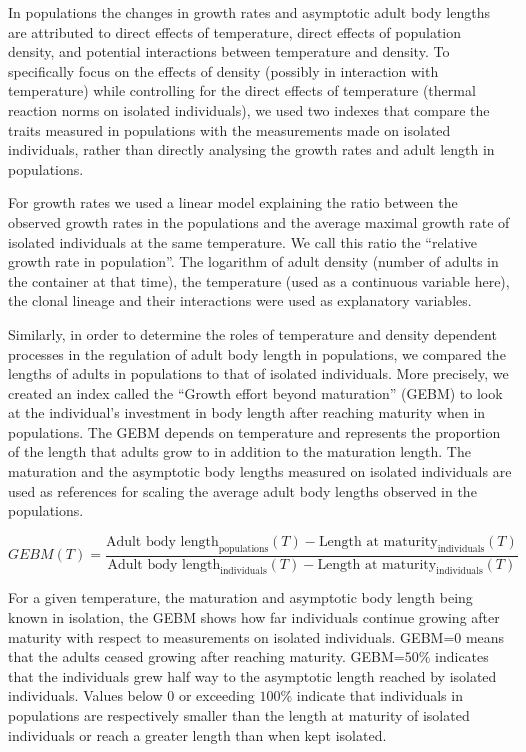 In populations the changes in growth rates and asymptotic adult body lengths are
attributed to direct effects of temperature, direct effects of population
density, and potential interactions between temperature and density. To
specifically focus on the effects of density (possibly in interaction with
temperature) while controlling for the direct effects of temperature (thermal
reaction norms on isolated individuals), we used two indexes that compare the
traits measured in populations with the measurements made on isolated
individuals, rather than directly analysing the growth rates and adult length in
populations.

For growth rates we used a linear model explaining the ratio between the
observed growth rates in the populations and the average maximal growth rate of
isolated individuals at the same temperature. We call this ratio the ``relative
growth rate in population''. The logarithm of adult density (number of adults in
the container at that time), the temperature (used as a continuous variable
here), the clonal lineage and their interactions were used as explanatory
variables.

Similarly, in order to determine the roles of temperature and density dependent
processes in the regulation of adult body length in populations, we compared the
lengths of adults in populations to that of isolated individuals. More
precisely, we created an index called the ``Growth effort beyond maturation''
(GEBM) to look at the individual’s investment in body length after reaching
maturity when in populations. The GEBM depends on temperature and represents the
proportion of the length that adults grow to in addition to the maturation
length. The maturation and the asymptotic body lengths measured on isolated
individuals are used as references for scaling the average adult body lengths
observed in the populations.


\begin{equation}
GEBM(T)=\frac{\text{Adult body length}_{\text{populations}}(T) -
\text{Length at maturity}_{\text{individuals}}(T)}{\text{Adult body
length}_{\text{individuals}}(T) -
\text{Length at maturity}_{\text{individuals}}(T)}
\end{equation}
 
For a given temperature, the maturation and asymptotic body length being known
in isolation, the GEBM shows how far individuals continue growing after maturity
with respect to measurements on isolated individuals. GEBM=0 means that the
adults ceased growing after reaching maturity. GEBM=$50\%$ indicates that the
individuals grew half way to the asymptotic length reached by isolated
individuals. Values below 0 or exceeding $100\%$ indicate that individuals in
populations are respectively smaller than the length at maturity of isolated
individuals or reach a greater length than when kept isolated.

